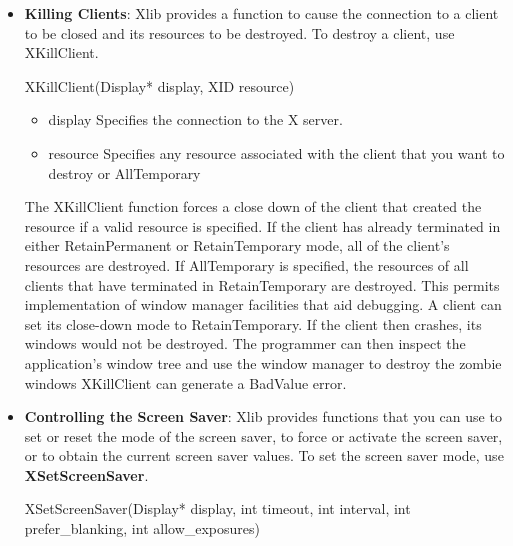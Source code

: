 \documentclass{report}
\begin{document}
\begin{itemize}
\begin{itemize}
            \end{itemize}
            The XUngrabServer function restarts processing of requests and close downs on other connections. You should avoid grabbing the X server as much as possible.
        \item \textbf{Killing Clients}: Xlib provides a function to cause the connection to a client to be closed and its resources to be destroyed. To destroy a client, use XKillClient.
            \bigbreak \noindent 
            \begin{cppcode}
                XKillClient(Display* display, XID resource)
            \end{cppcode}
            \bigbreak \noindent
            \begin{itemize}
                \item display Specifies the connection to the X server.
                \item resource Specifies any resource associated with the client that you want to destroy or AllTemporary
            \end{itemize}
            The XKillClient function forces a close down of the client that created the resource if a valid resource is specified. If the client has already terminated in either RetainPermanent or RetainTemporary mode, all of the client’s resources are destroyed. If AllTemporary is specified, the resources of all clients that have terminated in RetainTemporary are destroyed. This permits implementation of window manager facilities that aid debugging. A client can set its close-down mode to RetainTemporary. If the client then crashes, its windows would not be destroyed. The programmer can then inspect the application’s window tree and use the window manager to destroy the zombie windows
            \bigbreak \noindent 
            XKillClient can generate a BadValue error.
        \item \textbf{Controlling the Screen Saver}: Xlib provides functions that you can use to set or reset the mode of the screen saver, to force or activate the screen saver, or to obtain the current screen saver values.
            \bigbreak \noindent 
            To set the screen saver mode, use \textbf{XSetScreenSaver}.
            \bigbreak \noindent 
            \begin{cppcode}
            XSetScreenSaver(Display* display, int timeout, int interval, int prefer_blanking, int allow_exposures)
            \end{cppcode}
            \bigbreak \noindent
            \begin{itemize}

\end{itemize}
\end{itemize}
\end{document}
